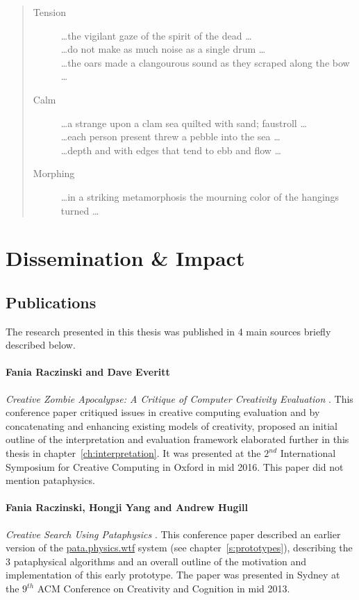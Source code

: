 \begin{quotation}
\begin{description}
  \item [Tension] \ldots the vigilant gaze of the spirit of the dead \ldots \\ \ldots do not make as much noise as a single drum \ldots \\ \ldots the oars made a clangourous sound as they scraped along the bow \ldots
  \item [Calm] \ldots a strange upon a clam sea quilted with sand; faustroll \ldots \\ \ldots each person present threw a pebble into the sea \ldots \\ \ldots depth and with edges that tend to ebb and flow \ldots 
  \item [Morphing] \ldots in a striking metamorphosis the mourning color of the hangings turned \ldots 
\end{description}
\end{quotation}


\section{Dissemination \& Impact}


\subsection{Publications}
\label{s:public}

The research presented in this thesis was published in 4 main sources briefly described below.

\paragraph{Fania Raczinski and Dave Everitt} \textit{Creative Zombie Apocalypse: A Critique of Computer Creativity Evaluation} \autocite*{Raczinski2016}. This conference paper critiqued issues in creative computing evaluation and by concatenating and enhancing existing models of creativity, proposed an initial outline of the interpretation and evaluation framework elaborated further in this thesis in chapter~\ref{ch:interpretation}. It was presented at the $2^{nd}$ International Symposium for Creative Computing in Oxford in mid 2016. This paper did not mention pataphysics.

\paragraph{Fania Raczinski, Hongji Yang and Andrew Hugill} \textit{Creative Search Using Pataphysics} \autocite*{Raczinski2013}. This conference paper described an earlier version of the \url{pata.physics.wtf} system (see chapter~\ref{s:prototypes}), describing the 3 pataphysical algorithms and an overall outline of the motivation and implementation of this early prototype. The paper was presented in Sydney at the $9^{th}$ ACM Conference on Creativity and Cognition in mid 2013.

